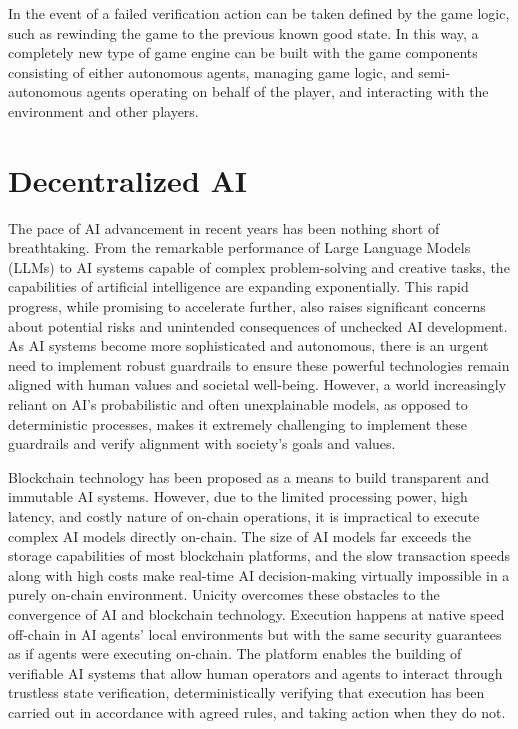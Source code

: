 \documentclass{article}
\begin{document}
In the event of a failed verification action can be taken defined by the game logic, such as rewinding the game to the previous known good state. In this way, a completely new type of game engine can be built with the game components consisting of either autonomous agents, managing game logic, and semi-autonomous agents operating on behalf of the player, and interacting with the environment and other players.

\section{Decentralized AI}



The pace of AI advancement in recent years has been nothing short of breathtaking. From the remarkable performance of Large Language Models (LLMs) to AI systems capable of complex problem-solving and creative tasks, the capabilities of artificial intelligence are expanding exponentially. This rapid progress, while promising to accelerate further, also raises significant concerns about potential risks and unintended consequences of unchecked AI development. As AI systems become more sophisticated and autonomous, there is an urgent need to implement robust guardrails to ensure these powerful technologies remain aligned with human values and societal well-being. However, a world increasingly reliant on AI's probabilistic and often unexplainable models, as opposed to deterministic processes, makes it extremely challenging to implement these guardrails and verify alignment with society's goals and values.



Blockchain technology has been proposed as a means to build transparent and immutable AI systems. However, due to the limited processing power, high latency, and costly nature of on-chain operations, it is impractical to execute complex AI models directly on-chain. The size of AI models far exceeds the storage capabilities of most blockchain platforms, and the slow transaction speeds along with high costs make real-time AI decision-making virtually impossible in a purely on-chain environment. Unicity overcomes these obstacles to the convergence of AI and blockchain technology. Execution happens at native speed off-chain in AI agents' local environments but with the same security guarantees as if agents were executing on-chain. The platform enables the building of verifiable AI systems that allow human operators and agents to interact through trustless state verification, deterministically verifying that execution has been carried out in accordance with agreed rules, and taking action when they do not.
\end{document}
